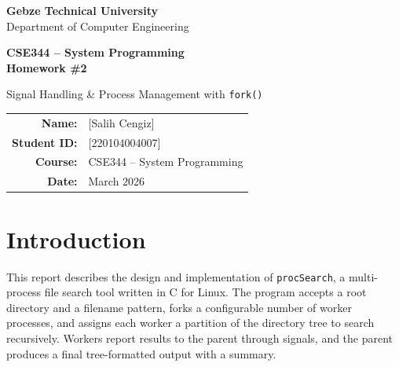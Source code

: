 \documentclass[12pt,a4paper]{article}
\begin{document}
\begin{titlepage}
    \centering
    \vspace*{3cm}

    {\Large\textbf{Gebze Technical University}\\
    Department of Computer Engineering}

    \vspace{2cm}

    {\LARGE\textbf{CSE344 -- System Programming\\Homework \#2}}

    \vspace{1cm}

    {\Large Signal Handling \& Process Management with \texttt{fork()}}

    \vspace{3cm}

    \begin{tabular}{rl}
        \textbf{Name:}       & [Salih Cengiz] \\
        \textbf{Student ID:} & [220104004007] \\
        \textbf{Course:}     & CSE344 -- System Programming \\
        \textbf{Date:}       & March 2026 \\
    \end{tabular}

    \vfill
\end{titlepage}

\tableofcontents
\newpage

\section{Introduction}

This report describes the design and implementation of \texttt{procSearch}, a multi-process file search tool written in C for Linux. The program accepts a root directory and a filename pattern, forks a configurable number of worker processes, and assigns each worker a partition of the directory tree to search recursively. Workers report results to the parent through signals, and the parent produces a final tree-formatted output with a summary.
\end{document}
